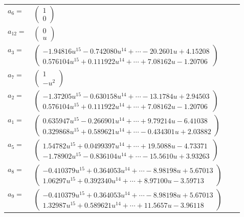 \documentclass[1p]{elsarticle_modified}
\theoremstyle{definition}
\begin{document}
\begin{tabular}{m{7pt} m{180pt} m{7pt} m{180pt} }
\flushright $a_{6}=$&$\begin{pmatrix}1\\0\end{pmatrix}$ \\
\flushright $a_{12}=$&$\begin{pmatrix}0\\u\end{pmatrix}$ \\
\flushright $a_{3}=$&$\begin{pmatrix}-1.94816 u^{15}-0.742080 u^{14}+\cdots-20.2601 u+4.15208\\0.576104 u^{15}+0.111922 u^{14}+\cdots+7.08162 u-1.20706\end{pmatrix}$ \\
\flushright $a_{7}=$&$\begin{pmatrix}1\\- u^2\end{pmatrix}$ \\
\flushright $a_{2}=$&$\begin{pmatrix}-1.37205 u^{15}-0.630158 u^{14}+\cdots-13.1784 u+2.94503\\0.576104 u^{15}+0.111922 u^{14}+\cdots+7.08162 u-1.20706\end{pmatrix}$ \\
\flushright $a_{1}=$&$\begin{pmatrix}0.635947 u^{15}-0.266901 u^{14}+\cdots+9.79214 u-6.41038\\0.329868 u^{15}+0.589621 u^{14}+\cdots-0.434301 u+2.03882\end{pmatrix}$ \\
\flushright $a_{5}=$&$\begin{pmatrix}1.54782 u^{15}+0.0499397 u^{14}+\cdots+19.5088 u-4.73371\\-1.78902 u^{15}-0.836104 u^{14}+\cdots-15.5610 u+3.93263\end{pmatrix}$ \\
\flushright $a_{8}=$&$\begin{pmatrix}-0.410379 u^{15}+0.364053 u^{14}+\cdots-8.98198 u+5.67013\\1.06297 u^{15}+0.392340 u^{14}+\cdots+8.97100 u-3.59713\end{pmatrix}$ \\
\flushright $a_{9}=$&$\begin{pmatrix}-0.410379 u^{15}+0.364053 u^{14}+\cdots-8.98198 u+5.67013\\1.32987 u^{15}+0.589621 u^{14}+\cdots+11.5657 u-3.96118\end{pmatrix}$ \\

\end{tabular}
\end{document}
